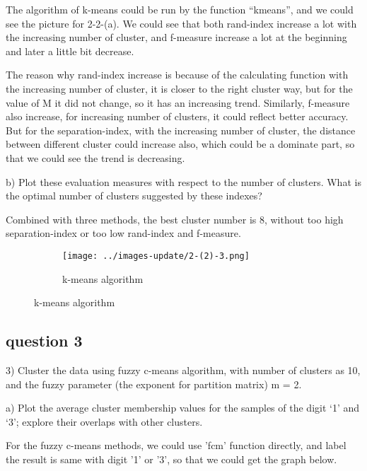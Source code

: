 \documentclass[]{article}
\begin{document}
The algorithm of k-means could be run by the function “kmeans”, and we could see the picture for 2-2-(a). We could see that both rand-index increase a lot with the increasing number of cluster, and f-measure increase a lot at the beginning and later a little bit decrease.



The reason why rand-index increase is because of the calculating function with the increasing number of cluster, it is closer to the right cluster way, but for the value of M it did not change, so it has an increasing trend. Similarly, f-measure also increase, for increasing number of clusters, it could reflect better accuracy. But for the separation-index, with the increasing number of cluster, the distance between different cluster could increase also, which could be a dominate part, so that we could see the trend is decreasing.

b) Plot these evaluation measures with respect to the number of clusters. What is the optimal number of clusters suggested by these indexes?

Combined with three methods, the best cluster number is 8, without too high separation-index or too low rand-index and f-measure.


\begin{figure}[p]
	\centering
	\begin{subfigure}{.5\textwidth}
		\centering
		\texttt{[image: ../images-update/2-(2)-3.png]}
		\caption{k-means algorithm}
		\label{fig:sub1}
	\end{subfigure}
	
	
	
\end{figure}



\subsection{question 3}

3) Cluster the data using fuzzy c-means algorithm, with number of clusters as 10, and the fuzzy parameter (the exponent for partition matrix) m = 2.

a) Plot the average cluster membership values for the samples of the digit ‘1’ and ‘3’; explore their overlaps with other clusters.

For the fuzzy c-means methods, we could use 'fcm' function directly, and label the result is same with digit '1' or '3', so that we could get the graph below.
\end{document}
